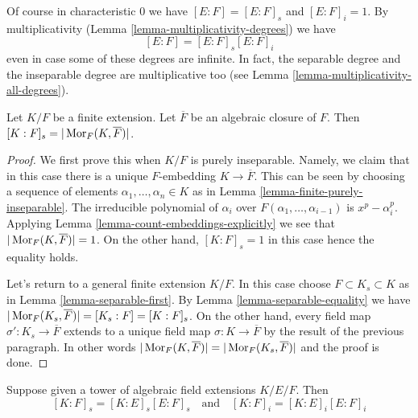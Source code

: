 \noindent
Of course in characteristic $0$ we have $[E : F] = [E : F]_s$ and
$[E : F]_i = 1$. By multiplicativity
(Lemma \ref{lemma-multiplicativity-degrees}) we have
$$
[E : F] = [E : F]_s [E : F]_i
$$
even in case some of these degrees are infinite. In fact, the separable
degree and the inseparable degree are multiplicative too (see
Lemma \ref{lemma-multiplicativity-all-degrees}).

\begin{lemma}
\label{lemma-separable-degree}
Let $K/F$ be a finite extension. Let $\overline{F}$ be an algebraic
closure of $F$. Then $[K : F]_s = |\mathop{\mathrm{Mor}}\nolimits_F(K, \overline{F})|$.
\end{lemma}

\begin{proof}
We first prove this when $K/F$ is purely inseparable. Namely, we claim that
in this case there is a unique $F$-embedding $K \to \overline{F}$. This can be
seen by choosing a sequence of elements $\alpha_1, \ldots, \alpha_n \in K$
as in Lemma \ref{lemma-finite-purely-inseparable}. The irreducible polynomial
of $\alpha_i$ over $F(\alpha_1, \ldots, \alpha_{i - 1})$ is $x^p - \alpha_i^p$.
Applying Lemma \ref{lemma-count-embeddings-explicitly} we see that
$|\mathop{\mathrm{Mor}}\nolimits_F(K, \overline{F})| = 1$. On the other hand, $[K : F]_s = 1$
in this case hence the equality holds.

\medskip\noindent
Let's return to a general finite extension $K/F$. In this case
choose $F \subset K_s \subset K$ as in Lemma \ref{lemma-separable-first}.
By Lemma \ref{lemma-separable-equality} we have
$|\mathop{\mathrm{Mor}}\nolimits_F(K_s, \overline{F})| = [K_s : F] = [K : F]_s$.
On the other hand, every field map $\sigma' : K_s \to \overline{F}$
extends to a unique field map $\sigma : K \to \overline{F}$ by the
result of the previous paragraph. In other words
$|\mathop{\mathrm{Mor}}\nolimits_F(K, \overline{F})| = |\mathop{\mathrm{Mor}}\nolimits_F(K_s, \overline{F})|$
and the proof is done.
\end{proof}

\begin{lemma}[Multiplicativity]
\label{lemma-multiplicativity-all-degrees}
Suppose given a tower of algebraic field extensions $K/E/F$. Then
$$
[K : F]_s = [K : E]_s [E : F]_s
\quad\text{and}\quad
[K : F]_i = [K : E]_i [E : F]_i
$$
\end{lemma}

